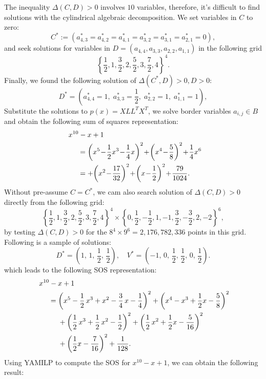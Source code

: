 \documentclass[runningheads]{llncs}
\newcommand{\Qo}{\Delta}
\begin{document}
{The inequality ${\Qo}(C,D)>0$ involves $10$ variables, therefore, it's difficult to find solutions with the cylindrical algebraic decomposition. 
We set variables in $C$ to zero:
$$
C^{\ast}:=\left(a_{4,3}^*=a_{4,2}^*=a_{4,1}^*=a_{3,2}^*=a_{3,1}^*=a_{2,1}^*=0\right),
$$
and seek solutions for variables in 
$D=\left(a_{4,4},a_{3,3},a_{2,2},a_{1,1}\right)$  
in the following grid
$$
\left\{\frac{1}{2},1,\frac{3}{2},2,\frac{5}{2},3,\frac{7}{2},4\right\}^4.
$$
Finally, we found the following solution of 
${\Qo}(C^{\ast},D)>0, D>0$:
$$
D^{\ast}=\left(a_{4,4}^*=1,\; a_{3,3}^*=\frac{1}{2},\; a_{2,2}^*=1,\;a_{1,1}^*=1\right),
$$
Substitute the solutions to $p(x)=XLL^TX^T$, we solve border variables $a_{i,j}\in B$ and obtain the following sum of squares representation: 
\begin{align}\label{eq-0000002}
&
~~~~{x}^{10}-x+1\notag\\
&~~~~~~~~= \left( {x}^{5}\!-\!\frac{1}{2}{x}^{3}\!-\!\frac{1}{4}x \right) ^{2}\!+\! \left( {x}
^{4}\!-\!\frac{5}{8} \right) ^{2}\!+\!\frac{1}{4}{x}^{6}\!\notag\\
&~~~~~~~~=+\! \left( {x}^{2}\!-\!{\frac{17}{32}}
 \right) ^{2}\!+\! \left( x\!-\!\frac{1}{2} \right) ^{2}\!+\!{\frac{79}{1024}}.
&
\end{align}
Without pre-assume $C=C^{\ast}$, we cam also search solution of ${\Qo}(C,D)>0$ directly from the following grid:
$$
\left\{\frac{1}{2},1,\frac{3}{2},2,\frac{5}{2},3,\frac{7}{2},4\right\}^4\times
\left\{0,\frac{1}{2},-\frac{1}{2},1,-1,\frac{3}{2},-\frac{3}{2},2,-2\right\}^6,
$$
by testing ${\Qo}(C,D)>0$ for the $8^4\times 9^6=2,176,782,336$ points in this grid. Following is a sample of solutions: 
$$
D^*=\left(1,\,1,\,\frac{1}{2},\,\frac{1}{2}\right), \quad
V^*=\left(-1,\,0,\,\frac{1}{2},\,\frac{1}{2},\,0,\,\frac{1}{2}\right).
$$
which leads to the following SOS representation:
\begin{align}\label{eq-0000001}
&
~~~~{x}^{10}-x+1\notag\\
&~~~~~~~~= \left( {x}^{5}-\frac{1}{2}\,{x}^{3}+{x}^{2}-\frac{3}{4}\,x-\frac{1}{4} \right) ^
{2}+ \left( {x}^{4}-{x}^{3}+\frac{1}{2}x-\frac{5}{8} \right) ^{2}\notag\\
&~~~~~~~~~~~~+ \left( \frac{1}{2}\,{x}^{3}+
\frac{1}{2}\,{x}^{2}-\frac{1}{2} \right) ^{2}+ \left( \frac{1}{2}\,{x}^{2}+\frac{1}{2}x-{\frac{5}{16}}
 \right) ^{2} \notag\\
 &~~~~~~~~~~~~+\left( \frac{1}{2}x-{\frac{7}{16}} \right) ^{2}+{\frac{1}{128}}.
&
\end{align}
Using YAMILP to compute the SOS for $x^{10}-x+1$, we can obtain the following result: 
}
\end{document}
